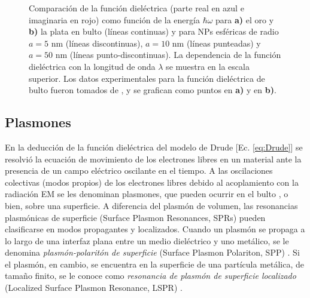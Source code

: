 \begin{figure}[h!]
\begin{subfigure}{.7\linewidth}
	\end{subfigure}\vspace*{-.7em}
	\caption{Comparación de la función dieléctrica (parte real en azul e imaginaria en rojo) como función de la energía $\hbar\omega$ para \textbf{a)} el oro y \textbf{b)} la plata en bulto (líneas continuas) y para NPs esféricas de radio $a=5$ nm (líneas discontinuas), $a=10$ nm (líneas punteadas) y $a=50$ nm (líneas punto-discontinuas). La dependencia de la función dieléctrica con la longitud de onda $\lambda$ se muestra en la escala superior. Los datos experimentales para la función dieléctrica de bulto fueron tomados de \cite{johnson1972constants}, y se grafican como puntos en \textbf{a)} y en \textbf{b)}.}\label{fig:sizeCorrection}
	\end{figure}	

\subsection{Plasmones}

En la deducción de la función dieléctrica del modelo de Drude [Ec. \eqref{eq:Drude}] se resolvió la ecuación de movimiento de los electrones libres en un material ante la  presencia de un campo eléctrico oscilante en el tiempo. A las oscilaciones colectivas (modos propios) de los electrones libres debido al acoplamiento con la radiación EM se les denominan  plasmones, que pueden ocurrir en el bulto \cite{stockman2011nanoplasmonics}, o bien, sobre una superficie. A diferencia del plasmón de volumen, las resonancias plasmónicas de superficie (Surface Plasmon Resonances, SPRs) pueden clasificarse en modos propagantes y localizados. Cuando un plasmón se propaga a lo largo de una interfaz plana entre un medio diel\'ectrico y uno met\'alico, se le denomina  \emph{plasm\'on-polarit\'on de superficie} (Surface Plasmon Polariton, SPP) \cite{maier2007plasmonics}.  Si el plasmón, en cambio, se encuentra en la superficie de una partícula  met\'alica, de tamaño finito, se le conoce como \emph{resonancia de plasm\'on de superficie localizado} (Localized Surface Plasmon Resonance, LSPR) \cite{maier2007plasmonics}.

